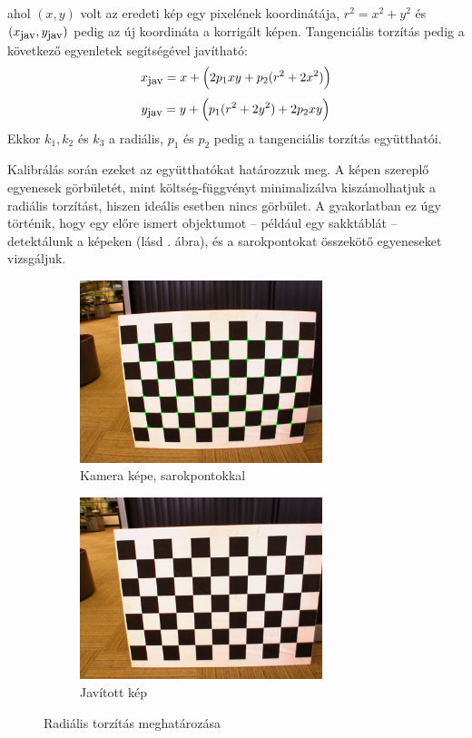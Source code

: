 ahol $(x,y)$ volt az eredeti kép egy pixelének koordinátája, $r^2 = x^2 + y^2$ és $(x_{\hbox{\small jav}}, y_{\hbox{\small jav}})$ pedig az új koordináta a korrigált képen. Tangenciális torzítás pedig a következő egyenletek segítségével javítható:
\[x_{\hbox{\small jav}} = x + \Big(2p_1xy + p_2(r^2+2x^2)\Big)\]
\[y_{\hbox{\small jav}} = y + \Big(p_1(r^2+2y^2) + 2p_2xy\Big)\]
Ekkor $k_1, k_2$ és $k_3$ a radiális, $p_1$ és $p_2$ pedig a tangenciális torzítás együtthatói.

Kalibrálás során ezeket az együtthatókat határozzuk meg. A képen szereplő egyenesek görbületét, mint költség-függvényt minimalizálva kiszámolhatjuk a radiális torzítást, hiszen ideális esetben nincs görbület. A gyakorlatban ez úgy történik, hogy egy előre ismert objektumot -- például egy sakktáblát -- detektálunk a képeken (lásd . ábra), és a sarokpontokat összekötő egyeneseket vizsgáljuk.

\begin{figure}[tbh]
\centering
\begin{subfigure}[b]{0.49\linewidth}
	\centering
	\includegraphics[width=200pt]{figures/distorted.png}
	\caption{Kamera képe, sarokpontokkal}
  \end{subfigure}
\begin{subfigure}[b]{0.49\linewidth}
	\centering
	\includegraphics[width=200pt]{figures/undistorted.png}
	\caption{Javított kép}
  \end{subfigure}
\caption{Radiális torzítás meghatározása \cite{pinhole-model} \label{fig:chessboards}}
\end{figure}

